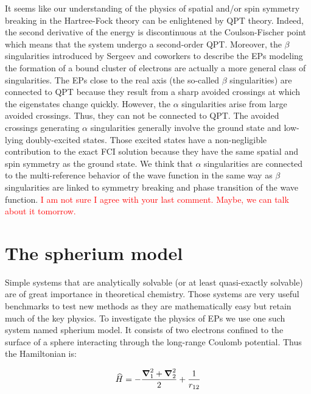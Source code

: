 \documentclass[11pt,a4paper]{article}
\newcommand{\titou}[1]{\textcolor{red}{#1}}
\begin{document}
It seems like our understanding of the physics of spatial and/or spin symmetry breaking in the Hartree-Fock theory can be enlightened by QPT theory. Indeed, the second derivative of the energy is discontinuous at the Coulson-Fischer point which means that the system undergo a second-order QPT. Moreover, the $\beta$ singularities introduced by Sergeev and coworkers to describe the EPs modeling the formation of a bound cluster of electrons are actually a more general class of singularities. The EPs close to the real axis (the so-called $\beta$ singularities) are connected to QPT because they result from a sharp avoided crossings at which the eigenstates change quickly. However, the $\alpha$ singularities arise from large avoided crossings. Thus, they can not be connected to QPT. The avoided crossings generating $\alpha$ singularities generally involve the ground state and low-lying doubly-excited states. Those excited states have a non-negligible contribution to the exact FCI solution because they have the same spatial and spin symmetry as the ground state. We think that $\alpha$ singularities are connected to the multi-reference behavior of the wave function in the same way as $\beta$ singularities are linked to symmetry breaking and phase transition of the wave function. 
\titou{I am not sure I agree with your last comment. Maybe, we can talk about it tomorrow.}

\section{The spherium model}\label{sec:spherium}

Simple systems that are analytically solvable (or at least quasi-exactly solvable) are of great importance in theoretical chemistry. Those systems are very useful benchmarks to test new methods as they are mathematically easy but retain much of the key physics. To investigate the physics of EPs we use one such system named spherium model. It consists of two electrons confined to the surface of a sphere interacting through the long-range Coulomb potential. Thus the Hamiltonian is:

\begin{equation}
\widehat{H} = -\frac{\grad_1^2 + \grad_2^2}{2} + \frac{1}{r_{12}}
\end{equation}
\end{document}
